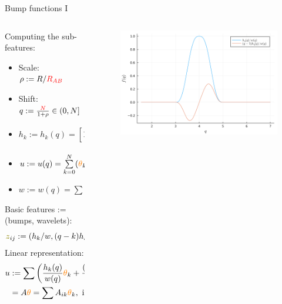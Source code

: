 \documentclass{beamer}
\begin{document}
\begin{frame}{Bump functions I}
    \fontsize{6.5}{5}\selectfont
    \begin{columns}
        \begin{column}{0.4\textwidth}
            Computing the sub-features:
            \begin{itemize}
                \item Scale: $\rho := R/{\color{red}R_{AB}}$
                \item Shift: $q := \frac{\color{red}{N}}{1+\rho} \in (0, N]$
                \item $h_k := h_k(q) = [1 - (q - k)^2]^3_+$
                \item $u := u(q) =  \sum^N\limits_{k=0}({\color{orange}\theta}_k(q-k)+{\color{orange}\theta}_{k+N+1})h_k$
                \item $w := w(q) = \sum h_k$
            \end{itemize}
            Basic features := (bumps, wavelets):
            \begin{equation}
                {\color{olive}z}_{ij} := (h_k/w, (q-k)h_k/w).
            \end{equation}
            Linear representation:
            \begin{equation}
                \begin{split}
                    u & := \sum \left(\frac{h_k(q)}{w(q)}{\color{orange}\theta}_k + \frac{(q-k)h_k(q)}{w(q)}{\color{orange}\theta}_{k+N+1}\right) \\
                    & = A{\color{orange}\theta} = \sum A_{ik}{\color{orange}\theta}_k, \text{ if }q=q_i.
                \end{split}
            \end{equation}
        \end{column}
        \begin{column}{0.6\textwidth}
            \begin{figure}[H]
                \centering
                    \includegraphics[scale=0.33]{img/BUMP/BUMP_k=5.png}
                \label{fig:bumpxy}
            \end{figure}
        \end{column}
    \end{columns}
\end{frame}
\end{document}
